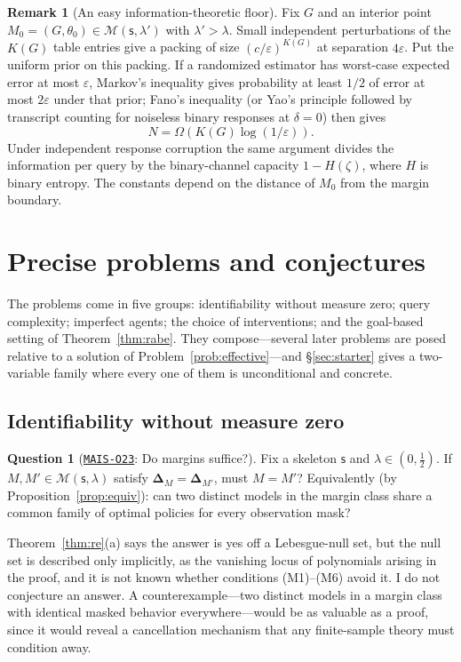 \documentclass[11pt]{amsart}
\newcommand{\Oid}[1]{\href{https://github.com/lionellevine/MAIS/blob/main/open-problems/MAIS-O#1.md}{\texttt{MAIS-O#1}}}
\theoremstyle{plain}
\theoremstyle{definition}
\newtheorem{question}[theorem]{Question}
\newtheorem{remark}[theorem]{Remark}
\newcommand{\MM}{\mathcal{M}}
\newcommand{\sk}{\mathsf{s}}
\begin{document}
\begin{remark}[An easy information-theoretic floor]\label{rem:packing}
Fix $G$ and an interior point $M_0=(G,\theta_0)\in\MM(\sk,\lambda')$ with $\lambda'>\lambda$. Small independent perturbations of the $K(G)$ table entries give a packing of size $(c/\varepsilon)^{K(G)}$ at separation $4\varepsilon$. Put the uniform prior on this packing. If a randomized estimator has worst-case expected error at most $\varepsilon$, Markov's inequality gives probability at least $1/2$ of error at most $2\varepsilon$ under that prior; Fano's inequality (or Yao's principle followed by transcript counting for noiseless binary responses at $\delta=0$) then gives
\[
   N=\Omega\!\left(K(G)\log(1/\varepsilon)\right).
\]
Under independent response corruption the same argument divides the information per query by the binary-channel capacity $1-H(\zeta)$, where $H$ is binary entropy. The constants depend on the distance of $M_0$ from the margin boundary.
\end{remark}

\section{Precise problems and conjectures}\label{sec:problems}

The problems come in five groups: identifiability without measure zero; query complexity; imperfect agents; the choice of interventions; and the goal-based setting of Theorem~\ref{thm:rabe}. They compose---several later problems are posed relative to a solution of Problem~\ref{prob:effective}---and \S\ref{sec:starter} gives a two-variable family where every one of them is unconditional and concrete.

\subsection{Identifiability without measure zero}

\begin{question}[\Oid{23}: Do margins suffice?]\label{q:ident}
Fix a skeleton $\sk$ and $\lambda\in(0,\tfrac12)$. If $M,M'\in\MM(\sk,\lambda)$ satisfy $\boldsymbol\Delta_M=\boldsymbol\Delta_{M'}$, must $M=M'$? Equivalently (by Proposition~\ref{prop:equiv}): can two distinct models in the margin class share a common family of optimal policies for every observation mask?
\end{question}

Theorem~\ref{thm:re}(a) says the answer is yes off a Lebesgue-null set, but the null set is described only implicitly, as the vanishing locus of polynomials arising in the proof, and it is not known whether conditions (M1)--(M6) avoid it. I do not conjecture an answer. A counterexample---two distinct models in a margin class with identical masked behavior everywhere---would be as valuable as a proof, since it would reveal a cancellation mechanism that any finite-sample theory must condition away.
\end{document}
